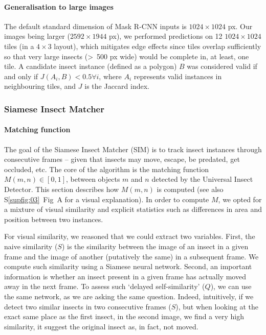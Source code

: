 \documentclass[12pt]{article}
\begin{document}
\begin{linenumbers}
		\paragraph{Generalisation to large images}
		The default standard dimension of Mask R-CNN inputs is $1024 \times{} 1024$ px. 
		Our images being larger ($2592 \times{} 1944$ px), we performed predictions on 12 $1024 \times{}1024$ tiles (in a $4 \times{} 3$ layout), which mitigates edge effects since tiles overlap sufficiently so that very large insects (>~500 px wide) would be complete in, at least, one tile. A candidate insect instance (defined as a polygon) $B$ was considered valid if and only if $J(A_{i}, B) < 0.5 \forall i$, where $A_i$ represents valid instances in neighbouring tiles, and $J$ is the Jaccard index.
		
		\subsubsection*{Siamese Insect Matcher}
		\paragraph{Matching function}
		The goal of the Siamese Insect Matcher (SIM) is to track insect instances through consecutive frames – given that insects may move, escape, be predated, get occluded, etc. The core of the algorithm is the matching function $M(m,n) \in [0, 1]$, between objects $m$ and $n$ detected by the Universal Insect Detector. 		
		This section describes how $M(m,n)$ is computed (see also S\ref{supfig:03}~Fig~A for a visual explanation).
		In order to compute $M$, we opted for a mixture of visual similarity and explicit statistics such as differences in area and position between two instances.
		
		For visual similarity, we reasoned that we could extract two variables. First, the naive similarity ($S$) is the similarity between the image of an insect in a given frame and the image of another (putatively the same) in a subsequent frame. We compute such similarity using a Siamese neural network. Second, an important information is whether an insect present in a given frame has actually moved away in the next frame. To assess such `delayed self-similarity' ($Q$), we can use the same network, as we are asking the same question.
		Indeed, intuitively, if we detect two similar insects in two consecutive frames ($S$), but when looking at the exact same place as the first insect, in the second image, we find a very high similarity, it suggest the original insect as, in fact, not moved. 
				

\end{linenumbers}
\end{document}

